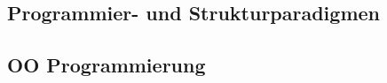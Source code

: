 \documentclass[a4paper,fontsize=9pt, DIV=calc]{scrartcl}
\begin{document}
\begin{multicols}{2}

\begin{multicols}{2}
\section[Programmier- und Strukturparadigmen]{\textcolor{siemensorange}{Programmier}- und \textcolor{siemensgreen}{Strukturparadigmen}}
\subsection[OO Programmierung]{\textcolor{siemensgreen}{OO Programmierung}}


\end{multicols}
\end{multicols}
\end{document}
